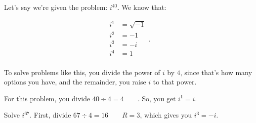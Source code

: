 \label{les_4_unit_4:simplify_powers_of_i_}

Let's say we're given the problem: $i^{40}$. We know that:

\begin{equation}
  \label{spt:powers_of_i}
  \begin{split}
    i^{1} &= \sqrt{-1} \\
    i^{2} &= -1 \\
    i^{3} &= -i \\
    i^{4} &= 1 \\
  \end{split}
.\end{equation}

To solve problems like this, you divide the power of $i$ by $4$, since that's
how many options you have, and the remainder, you raise $i$
to that power.

For this problem, you divide $40 \div 4 = 4 \qquad$. So, you get $i^{1} = i$.

\begin{example}
  \label{exm:simplfy_powers_of_i}

  Solve $i^{67}$. First, divide $67 \div 4 = 16 \qquad R = 3$, which gives you
  $i^{3} = -i$.
\end{example}

\newpage
